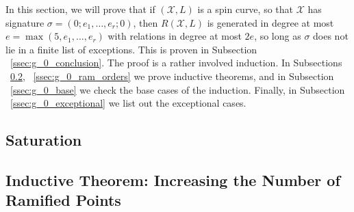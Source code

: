 \documentclass{amsart}
\theoremstyle{plain}
\theoremstyle{definition}
\theoremstyle{remark}
\numberwithin{equation}{section}
\newcommand\ssec{\subsection}
\newcommand \sx{\mathscr X}
\newcommand \halfcan{L}
\begin{document}
In this section, we will prove that if $(\sx,\halfcan)$ is a spin curve, so that $\sx$ has signature $\sigma = (0; e_1, \ldots, e_r;0)$, then $R(\sx,\halfcan)$ is generated in degree at most $e = \max(5, e_1, \ldots, e_r)$ with relations in degree at most $2e$, so long as $\sigma$ does not lie in a finite list of exceptions. This is proven in Subsection ~\ref{ssec:g_0_conclusion}. The proof is a rather involved induction. In Subsections ~\ref{ssec:g_0_ram_pts}, ~\ref{ssec:g_0_ram_orders} we prove inductive theorems, and in Subsection ~\ref{ssec:g_0_base} we check the base cases of the induction. Finally, in Subsection ~\ref{ssec:g_0_exceptional} we list out the exceptional cases.

\ssec{Saturation}
\label{ssec:g_0_saturation}

\ssec{Inductive Theorem: Increasing the Number of Ramified Points}
\label{ssec:g_0_ram_pts}
\end{document}
